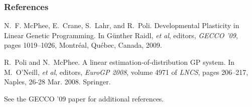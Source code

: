 \documentclass{beamer}
\newcommand{\linespace}{\vskip 0.25cm}
\begin{document}
\begin{frame} 
	\frametitle{References} 
	
	\begin{thebibliography}{lskdjf}
	
N.~F. McPhee, E.~Crane, S.~Lahr, and R.~Poli.
\newblock Developmental Plasticity in Linear Genetic Programming.
\newblock In G\"unther Raidl, \emph{et al}, editors, {\em GECCO '09}, pages 1019--1026, Montr\'eal, Qu\'ebec, Canada, 2009.
	
	R.~Poli and N.~McPhee.
\newblock A linear estimation-of-distribution {GP} system.
\newblock In M.~O'Neill, \emph{et al}, editors, {\em EuroGP 2008}, volume
  4971 of {\em LNCS}, pages 206--217, Naples,
  26-28 Mar. 2008. Springer.
  
  	\end{thebibliography}
	
	\linespace
	\begin{center}
	See the GECCO '09 paper for additional references.
	\end{center}
\end{frame} 
\end{document}
